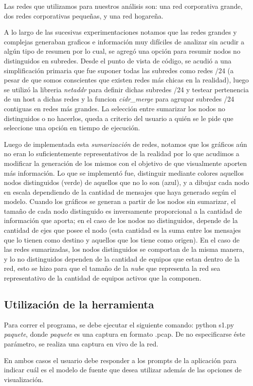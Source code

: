Las redes que utilizamos para nuestros análisis son: una red corporativa grande, dos redes corporativas pequeñas, y una red hogareña.

A lo largo de las sucesivas experimentaciones notamos que las redes grandes y complejas generaban graficos e información muy difíciles de analizar sin acudir a algún tipo de resumen por lo cual, se agregó una opción para resumir nodos no distinguidos en subredes. Desde el punto de vista de código, se acudió a una simplificación primaria que fue suponer todas las subredes como redes /24 (a pesar de que somos conscientes que existen redes más chicas en la realidad), luego se utilizó la libreria \textit{netaddr} para definir dichas subredes /24 y testear pertenencia de un host a dichas redes y la funcion \textit{cidr\_merge} para agrupar subredes /24 contiguas en redes más grandes. La selección entre sumarizar los nodos no distinguidos o no hacerlos, queda a criterio del usuario a quién se le pide que seleccione una opción en tiempo de ejecución.

Luego de implementada esta \textit{sumarización} de redes, notamos que los gráficos aún no eran lo suficientemente representativos de la realidad por lo que acudimos a modificar la generación de los mismos con el objetivo de que visualmente aporten más información. Lo que se implementó fue, distinguir mediante colores aquellos nodos distinguidos (verde) de aquellos que no lo son (azul), y a dibujar cada nodo en escala dependiendo de la cantidad de mensajes que haya generado según el modelo. Cuando los gráficos se generan a partir de los nodos sin sumarizar, el tamaño de cada nodo distinguido es inversamente proporcional a la cantidad de información que aporta; en el caso de los nodos no distinguidos, depende de la cantidad de ejes que posee el nodo (esta cantidad es la suma entre los mensajes que lo tienen como destino y aquellos que los tiene como origen). En el caso de las redes sumarizadas, los nodos distinguidos se comportan de la misma manera, y lo no distinguidos dependen de la cantidad de equipos que estan dentro de la red, esto se hizo para que el tamaño de la \textit{nube} que representa la red sea representativo de la cantidad de equipos activos que la componen.

\subsection{Utilización de la herramienta}
Para correr el programa, se debe ejecutar el siguiente comando: python s1.py \textit{paquete}, donde \textit{paquete} es una captura en formato .pcap. De no especificarse éste parámetro, se realiza una captura en vivo de la red.

En ambos casos el usuario debe responder a los prompts de la aplicación para indicar cuál es el modelo de fuente que desea utilizar además de las opciones de visualización.

